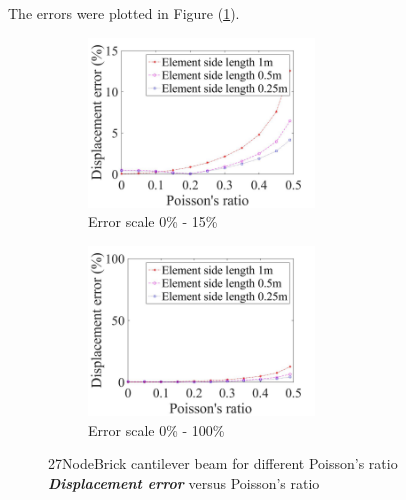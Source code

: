 \documentclass[fleqn,11pt]{article}
\begin{document}
The errors were plotted in Figure (\ref{fig error 27NodeBrick cantilever beam for different Poisson's ratio}).

\begin{figure}[H]
  \begin{subfigure}{0.5\textwidth}
    \centering
    \includegraphics[width=6cm]{../Figure-files/error27brick_beam_different_poisson_ratio_disp_div.jpeg}
    \caption{Error scale 0\% - 15\%}
  \end{subfigure}
  \begin{subfigure}{0.5\textwidth}
    \centering
    \includegraphics[width=6cm]{../Figure-files/error27brick_beam_different_poisson_ratio_disp_div100.jpeg}
    \caption{Error scale 0\% - 100\%}
  \end{subfigure}
  \captionsetup{justification=centering,margin=3cm}
  \caption{27NodeBrick cantilever beam for different Poisson's ratio\\
     \textbf{\emph{ Displacement error }}  versus   Poisson's ratio}
  \label{fig error 27NodeBrick cantilever beam for different Poisson's ratio}
\end{figure}
\end{document}
